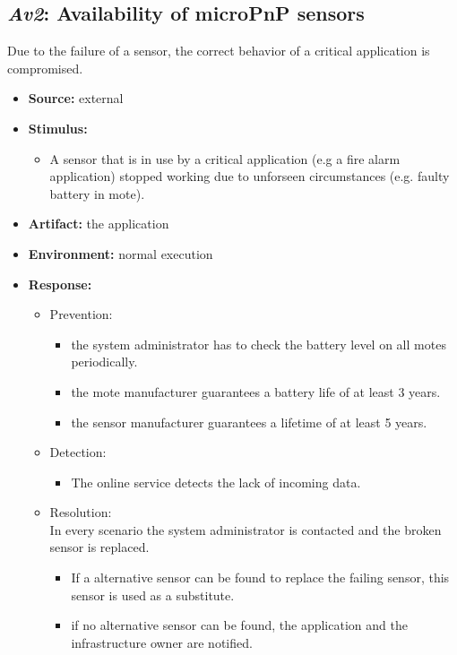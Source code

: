 \documentclass[english]{sareport}
\begin{document}
\subsection{\emph{Av2}: Availability of microPnP sensors}
Due to the failure of a sensor, the correct behavior of a critical application is compromised.
\begin{itemize}
    \item \textbf{Source:} external
    \item \textbf{Stimulus:}
        \begin{itemize}
            \item A sensor that is in use by a critical application (e.g a fire alarm application) stopped working due to unforseen circumstances (e.g. faulty battery in mote).
        \end{itemize}

    \item \textbf{Artifact:} the application
    \item \textbf{Environment:} normal execution
    \item \textbf{Response:}
        \begin{itemize}
            \item Prevention:
            \begin{itemize}
            	\item the system administrator has to check the battery level on all motes periodically.
            	\item the mote manufacturer guarantees a battery life of at least 3 years.
            	\item the sensor manufacturer guarantees a lifetime of at least 5 years.
            \end{itemize}
            \item Detection:
            \begin{itemize}
            	\item The online service detects the lack of incoming data.
            \end{itemize}
            \item Resolution:\\
            In every scenario the system administrator is contacted and the broken sensor is replaced.
            \begin{itemize}
            	\item If a alternative sensor can be found to replace the failing sensor, this sensor is used as a substitute.
            	\item if no alternative sensor can be found, the application and the infrastructure owner are notified.
            \end{itemize}
        \end{itemize}


\end{itemize}
\end{document}
